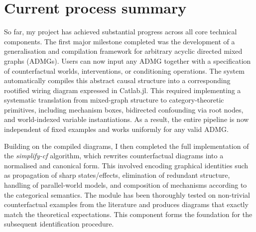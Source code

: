 \documentclass[12pt,a4paper]{article}
\begin{document}
\section{Current process summary}
So far, my project has achieved substantial progress across all core technical components. The first major milestone completed was the development of a generalisation and compilation framework for arbitrary acyclic directed mixed graphs (ADMGs). Users can now input any ADMG together with a specification of counterfactual worlds, interventions, or conditioning operations. The system automatically compiles this abstract causal structure into a corresponding rootified wiring diagram expressed in Catlab.jl. This required implementing a systematic translation from mixed-graph structure to category-theoretic primitives, including mechanism boxes, bidirected confounding via root nodes, and world-indexed variable instantiations. As a result, the entire pipeline is now independent of fixed examples and works uniformly for any valid ADMG.

Building on the compiled diagrams, I then completed the full implementation of the \textit{simplify-cf} algorithm, which rewrites counterfactual diagrams into a normalised and canonical form. This involved encoding graphical identities such as propagation of sharp states/effects, elimination of redundant structure, handling of parallel-world models, and composition of mechanisms according to the categorical semantics. The module has been thoroughly tested on non-trivial counterfactual examples from the literature and produces diagrams that exactly match the theoretical expectations. This component forms the foundation for the subsequent identification procedure.
\end{document}
